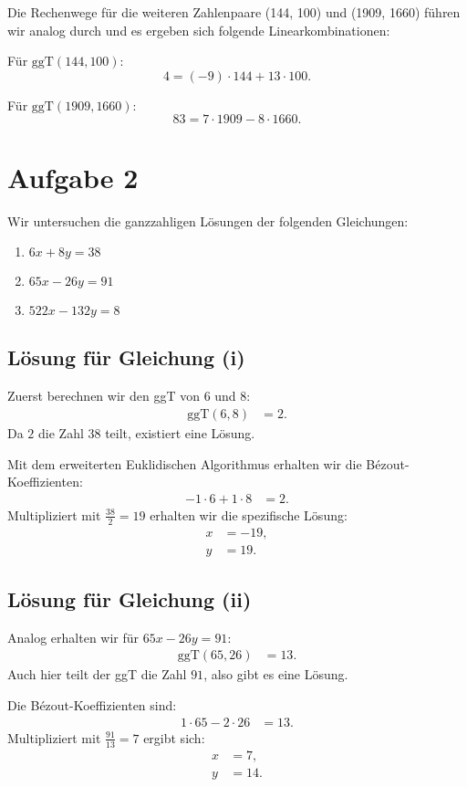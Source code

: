 \documentclass{article}
\begin{document}
Die Rechenwege für die weiteren Zahlenpaare (144, 100) und (1909, 1660) führen wir analog durch und es ergeben sich folgende Linearkombinationen:

Für \( \text{ggT}(144, 100) \):
\[ 4 = (-9) \cdot 144 + 13 \cdot 100. \]

Für \( \text{ggT}(1909, 1660) \):
\[ 83 = 7 \cdot 1909 - 8 \cdot 1660. \]


\section*{Aufgabe 2}

Wir untersuchen die ganzzahligen Lösungen der folgenden Gleichungen:

\begin{enumerate}
	\item \(6x + 8y = 38\)
	\item \(65x - 26y = 91\)
	\item \(522x - 132y = 8\)
\end{enumerate}

\subsection*{Lösung für Gleichung (i)}
Zuerst berechnen wir den ggT von \(6\) und \(8\):
\begin{align*}
	\text{ggT}(6, 8) & = 2.
\end{align*}
Da \(2\) die Zahl \(38\) teilt, existiert eine Lösung.

Mit dem erweiterten Euklidischen Algorithmus erhalten wir die Bézout-Koeffizienten:
\begin{align*}
	-1 \cdot 6 + 1 \cdot 8 & = 2.
\end{align*}
Multipliziert mit \(\frac{38}{2} = 19\) erhalten wir die spezifische Lösung:
\begin{align*}
	x & = -19, \\
	y & = 19.
\end{align*}

\subsection*{Lösung für Gleichung (ii)}
Analog erhalten wir für \(65x - 26y = 91\):
\begin{align*}
	\text{ggT}(65, 26) & = 13.
\end{align*}
Auch hier teilt der ggT die Zahl \(91\), also gibt es eine Lösung.

Die Bézout-Koeffizienten sind:
\begin{align*}
	1 \cdot 65 - 2 \cdot 26 & = 13.
\end{align*}
Multipliziert mit \(\frac{91}{13} = 7\) ergibt sich:
\begin{align*}
	x & = 7,  \\
	y & = 14.
\end{align*}
\end{document}
